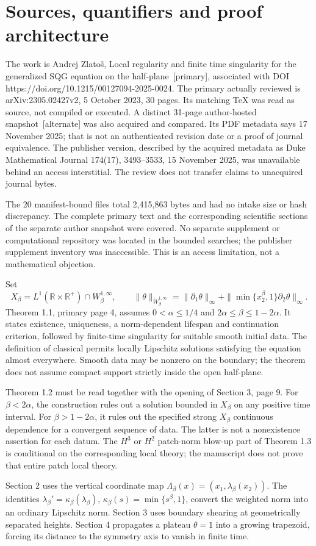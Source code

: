 \documentclass[10pt]{article}
\begin{document}
\section*{Sources, quantifiers and proof architecture}
The work is Andrej Zlatoš, Local regularity and finite time singularity for the generalized SQG equation on the half-plane [primary], associated with DOI https://doi.org/10.1215/00127094-2025-0024. The primary actually reviewed is arXiv:2305.02427v2, 5 October 2023, 30 pages. Its matching TeX was read as source, not compiled or executed. A distinct 31-page author-hosted snapshot [alternate] was also acquired and compared. Its PDF metadata says 17 November 2025; that is not an authenticated revision date or a proof of journal equivalence. The publisher version, described by the acquired metadata as Duke Mathematical Journal 174(17), 3493–3533, 15 November 2025, was unavailable behind an access interstitial. The review does not transfer claims to unacquired journal bytes.\par
The 20 manifest-bound files total 2,415,863 bytes and had no intake size or hash discrepancy. The complete primary text and the corresponding scientific sections of the separate author snapshot were covered. No separate supplement or computational repository was located in the bounded searches; the publisher supplement inventory was inaccessible. This is an access limitation, not a mathematical objection.\par
Set \[X_\beta=L^1(\mathbb R\times\mathbb R^+)\cap W^{1,\infty}_\beta,\qquad
 \|\theta\|_{\dot W^{1,\infty}_\beta}
 =\|\partial_1\theta\|_\infty+
   \|\min\{x_2^\beta,1\}\partial_2\theta\|_\infty.\] Theorem 1.1, primary page 4, assumes \(0<\alpha\le1/4\) and \(2\alpha\le\beta\le1-2\alpha\). It states existence, uniqueness, a norm-dependent lifespan and continuation criterion, followed by finite-time singularity for suitable smooth initial data. The definition of classical permits locally Lipschitz solutions satisfying the equation almost everywhere. Smooth data may be nonzero on the boundary; the theorem does not assume compact support strictly inside the open half-plane.\par
Theorem 1.2 must be read together with the opening of Section 3, page 9. For \(\beta<2\alpha\), the construction rules out a solution bounded in \(X_\beta\) on any positive time interval. For \(\beta>1-2\alpha\), it rules out the specified strong \(X_\beta\) continuous dependence for a convergent sequence of data. The latter is not a nonexistence assertion for each datum. The \(H^3\) or \(H^2\) patch-norm blow-up part of Theorem 1.3 is conditional on the corresponding local theory; the manuscript does not prove that entire patch local theory.\par
Section 2 uses the vertical coordinate map \(\Lambda_\beta(x)=(x_1,\lambda_\beta(x_2))\). The identities \(\lambda_\beta'=\kappa_\beta(\lambda_\beta)\), \(\kappa_\beta(s)=\min\{s^\beta,1\}\), convert the weighted norm into an ordinary Lipschitz norm. Section 3 uses boundary shearing at geometrically separated heights. Section 4 propagates a plateau \(\theta=1\) into a growing trapezoid, forcing its distance to the symmetry axis to vanish in finite time.\par
\end{document}
